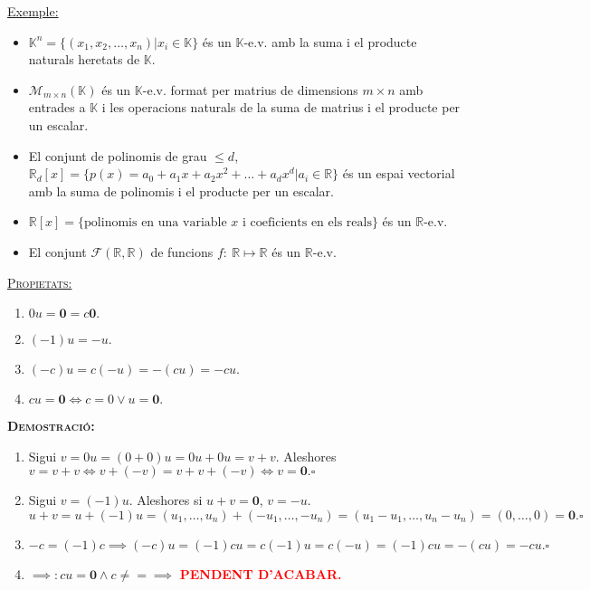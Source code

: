 \documentclass[11pt]{article}
\newcommand{\fieldk}{\mathbb{K}}
\newcommand{\demostracio}{\textbf{{\scshape Demostració: }}}
\newcommand{\ex}{\underline{Exemple:}}
\newcommand{\pendent}{\textcolor{red}{\textbf{PENDENT D'ACABAR.}}}
\begin{document}
\noindent \ex
\begin{itemize}
	\item $\mathbb{K}^n=\{(x_1,x_2,\ldots,x_n)|x_i\in\mathbb{K}\}$ és un $\mathbb{K}$-e.v. amb la suma i el producte naturals heretats de $\mathbb{K}$.
	\item $\mathcal{M}_{m\times n}(\mathbb{K})$ és un $\fieldk$-e.v. format per matrius de dimensions $m\times n$ amb entrades a $\fieldk$ i les operacions naturals de la suma de matrius i el producte per un escalar.
	\item El conjunt de polinomis de grau $\leq d$, $\mathbb{R}_d[x]=\{p(x)=a_0+a_1x+a_2x^2+\ldots+a_dx^d|a_i\in\mathbb{R}\}$ és un espai vectorial amb la suma de polinomis i el producte per un escalar.
	\item $\mathbb{R}[x]=\{\textrm{polinomis en una variable }x\textrm{ i coeficients en els reals}\}$ és un $\mathbb{R}$-e.v.
	\item El conjunt $\mathcal{F}(\mathbb{R},\mathbb{R})$ de funcions $f: \ \mathbb{R}\mapsto\mathbb{R}$ és un $\mathbb{R}$-e.v.
\end{itemize}
\underline{{\scshape Propietats:}}
\begin{enumerate}
	\item $0u=\textbf{0}=c\textbf{0}.$
	\item $(-1)u=-u.$
	\item $(-c)u=c(-u)=-(cu)=-cu.$
	\item $cu=\textbf{0}\iff c=0\vee u=\textbf{0}.$
\end{enumerate}
\demostracio
\begin{enumerate}
	\item Sigui $v=0u=(0+0)u=0u+0u=v+v$. Aleshores $v=v+v\iff v+(-v)=v+v+(-v)\iff v=\textbf{0}.\square$
	\item Sigui $v=(-1)u$. Aleshores si $u+v=\textbf{0}$, $v=-u$.
	$$u+v=u+(-1)u=(u_1,\ldots,u_n)+(-u_1,\ldots,-u_n)=(u_1-u_1,\ldots,u_n-u_n)=(0,\ldots,0)=\textbf{0}.\square$$
	\item $-c=(-1)c \implies (-c)u=(-1)cu=c(-1)u=c(-u)=(-1)cu=-(cu)=-cu.\square$
	\item $\implies: cu=\textbf{0} \wedge c\neq = \implies$ \pendent
\end{enumerate}

\newpage
\end{document}
